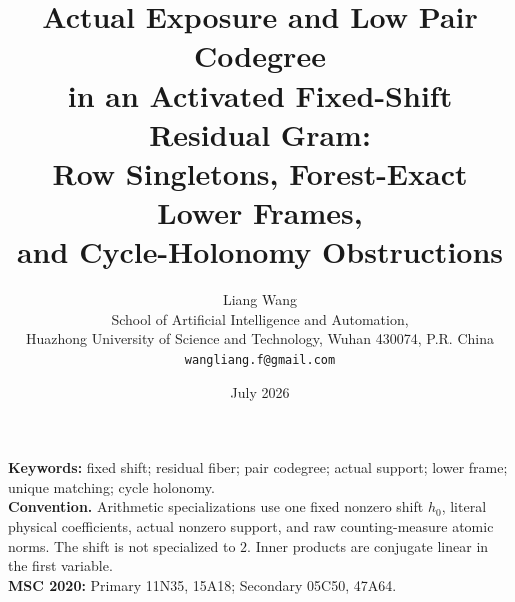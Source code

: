 \documentclass[11pt]{article}
\title{Actual Exposure and Low Pair Codegree\\
in an Activated Fixed-Shift Residual Gram:\\
Row Singletons, Forest-Exact Lower Frames,\\
and Cycle-Holonomy Obstructions}
\author{Liang Wang\\
School of Artificial Intelligence and Automation,\\
Huazhong University of Science and Technology, Wuhan 430074, P.R. China\\
\texttt{wangliang.f@gmail.com}}
\date{July 2026}
\theoremstyle{remark}
\begin{document}
\maketitle


\noindent\textbf{Keywords:} fixed shift; residual fiber; pair codegree;
actual support; lower frame; unique matching; cycle holonomy.\\[0.5em]
\noindent\textbf{Convention.} Arithmetic specializations use one fixed
nonzero shift \(h_0\), literal physical coefficients, actual nonzero support,
and raw counting-measure atomic norms. The shift is not specialized to \(2\).
Inner products are conjugate linear in the first variable.\\[0.5em]
\noindent\textbf{MSC 2020:} Primary 11N35, 15A18; Secondary 05C50, 47A64.











\begingroup
\small
\raggedright


\endgroup
\end{document}
